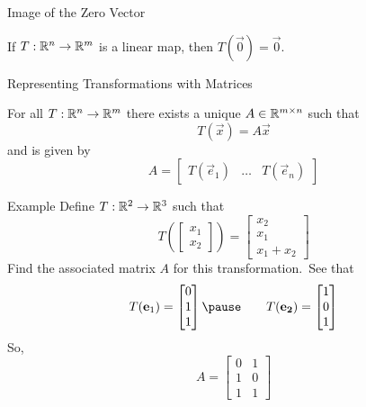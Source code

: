\documentclass[xcoler=dvipsnames, aspectratio=169]{beamer}
\begin{document}
\begin{frame}{Image of the Zero Vector}
    \begin{theorem}
        If $T:\mathbb{R}^n\rightarrow\mathbb{R}^m$ is a linear map, then $T(\vec{0}) = \vec{0}$.
    \end{theorem}
    \iftoggle{showSolutions}{
        \vspace{50pt}
        \begin{proof}
            Let $\vec{x}\in\R^n$ and $T(\vec{x})=\vec{b}\in\R^m$. See that\pause
            \[
                T(\vec{0}) = T(\vec{x}-\vec{x})\pause = T(\vec{x}) - T(\vec{x})\pause = 
                \vec{b}-\vec{b}\pause =\vec{0}
            \]
        \end{proof}
    }{
        \vspace{150pt}
    }
\end{frame}
\begin{frame}{Representing Transformations with Matrices}
    \begin{theorem}
        For all $T:\mathbb{R}^n\rightarrow\mathbb{R}^m$ there exists a unique $A\in\mathbb{R}^{m\times n}$ such that
        \[
            T(\vec{x}) = A\vec{x}
        \]
        and is given by
        \[
            A = \begin{bmatrix}T(\vec{e}_1) & \dots & T(\vec{e}_n)\end{bmatrix}
        \]
    \end{theorem}
    \vspace{150pt}
\end{frame}
\begin{frame}{Example}
    Define $T:\mathbb{R}^2\rightarrow\mathbb{R}^3$ such that
    \[
        T\left(\begin{bmatrix}x_1\\x_2\end{bmatrix}\right) = \begin{bmatrix}x_2\\x_1\\x_1+x_2\end{bmatrix}
    \]
    Find the associated matrix $A$ for this transformation.\pause\ 
    See that\pause
    \[
        T(\vec{e}_1) = \begin{bmatrix}0\\1\\1\end{bmatrix}\pause\qquad T(\vec{e_2}) = \begin{bmatrix}
            1\\0\\1\end{bmatrix}
    \]
    So, \pause
    \[
        A = \begin{bmatrix}
            0&1\\
            1&0\\
            1&1
        \end{bmatrix}
    \]
\end{frame}
\end{document}
